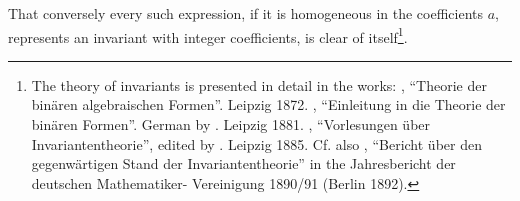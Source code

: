 
That conversely every such expression, if it is homogeneous in
the coefficients $a$, represents an invariant with integer coefficients,
is clear of itself\footnote{The theory of invariants is presented in detail in
the works: , ``Theorie der bin\"aren algebraischen Formen''.
Leipzig 1872. , ``Einleitung in die Theorie der bin\"aren
Formen''. German by . Leipzig 1881. , ``Vorlesungen
\"uber Invariantentheorie'', edited by . Leipzig
1885. Cf. also , ``Bericht \"uber den gegenw\"artigen Stand
der Invariantentheorie'' in the Jahresbericht der deutschen Mathematiker-
Vereinigung 1890/91 (Berlin 1892).}.

